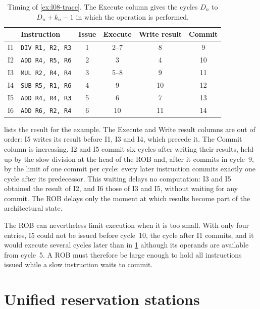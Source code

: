 \documentclass[../main.tex]{subfiles}
\begin{document}
\begin{table}[htbp]
  \centering\small
  \caption{Timing of \cref{ex:l08-trace}.  The Execute column gives the cycles
    $D_n$ to $D_n+k_n-1$ in which the operation is performed.}
  \label{tab:l08-timing}
  \begin{tabular}{@{}llcccc@{}}
    \toprule
    & Instruction & Issue & Execute & Write result & Commit \\
    \midrule
    I1 & \texttt{DIV R1, R2, R3} & 1 & 2--7 & 8  & 9  \\
    I2 & \texttt{ADD R4, R5, R6} & 2 & 3    & 4  & 10 \\
    I3 & \texttt{MUL R2, R4, R4} & 3 & 5--8 & 9  & 11 \\
    I4 & \texttt{SUB R5, R1, R6} & 4 & 9    & 10 & 12 \\
    I5 & \texttt{ADD R4, R4, R3} & 5 & 6    & 7  & 13 \\
    I6 & \texttt{ADD R6, R2, R4} & 6 & 10   & 11 & 14 \\
    \bottomrule
  \end{tabular}
\end{table}

 lists the result for the example.  The Execute and
Write result columns are out of order: I5 writes its result before I1, I3 and
I4, which precede it.  The Commit column is increasing.
I2 and I5 commit six
cycles after writing their results, held up by the slow division at the head
of the ROB and, after it commits in cycle~9, by the limit of one commit per
cycle: every later instruction commits exactly one cycle after its
predecessor.  This waiting delays no computation: I3 and I5 obtained the
result of I2, and I6 those of I3 and I5, without waiting for any commit.  The
ROB delays only the moment at which results become part of the architectural
state.

The ROB can nevertheless limit execution when it is too small.  With only four
entries, I5 could not be issued before cycle~10, the cycle after I1 commits,
and it would execute several cycles later than in \cref{tab:l08-timing} although its
operands are available from cycle~5.  A ROB must therefore be large enough to
hold all instructions issued while a slow instruction waits to commit.

\section{Unified reservation stations}
\label{sec:l08-unified}
\end{document}
